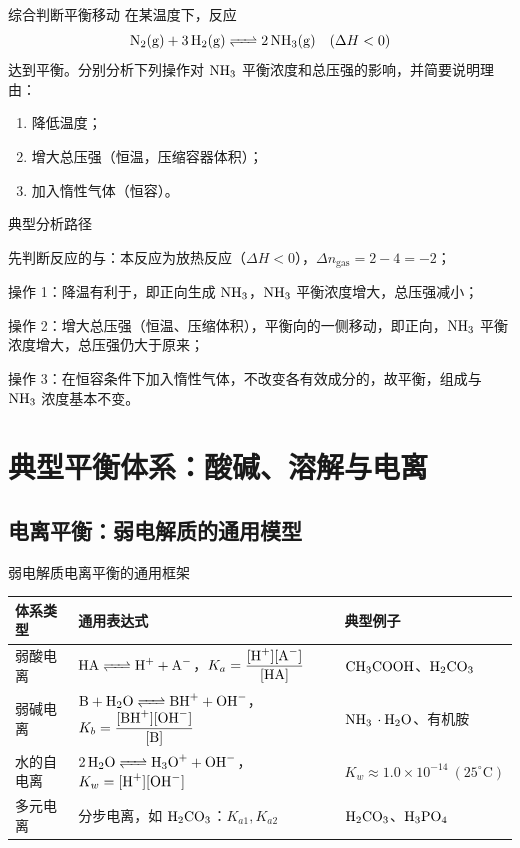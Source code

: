 \documentclass[a4paper,11pt]{ctexart}
\begin{document}
\begin{examplebox}{综合判断平衡移动}
  在某温度下，反应
  \[
    \ce{N2(g) + 3H2(g) <=> 2NH3(g)}\quad (\Delta H < 0)
  \]
  达到平衡。分别分析下列操作对 $\ce{NH3}$ 平衡浓度和总压强的影响，并简要说明理由：
  \begin{enumerate}
    \item 降低温度；
    \item 增大总压强（恒温，压缩容器体积）；
    \item 加入惰性气体（恒容）。
  \end{enumerate}

  \begin{proofbox}{典型分析路径}
    \begin{focuspoints}
      \item 先判断反应的与：本反应为放热反应（$\Delta H < 0$），$\Delta n_\mathrm{gas} = 2 - 4 = -2$；
      \item 操作 1：降温有利于，即正向生成 $\ce{NH3}$，$\ce{NH3}$ 平衡浓度增大，总压强减小；
      \item 操作 2：增大总压强（恒温、压缩体积），平衡向的一侧移动，即正向，$\ce{NH3}$ 平衡浓度增大，总压强仍大于原来；
      \item 操作 3：在恒容条件下加入惰性气体，不改变各有效成分的，故平衡，组成与 $\ce{NH3}$ 浓度基本不变。
    \end{focuspoints}
  \end{proofbox}
\end{examplebox}

\clearpage

\section{典型平衡体系：酸碱、溶解与电离}
\label{sec:specific-equilibria}

\subsection{电离平衡：弱电解质的通用模型}

\begin{summarybox}{弱电解质电离平衡的通用框架}
  \begin{tabularx}{0.96\textwidth}{>{\raggedright\arraybackslash}p{3.2cm} X X}
    \toprule
    体系类型 & 通用表达式 & 典型例子 \\
    \midrule
    弱酸电离 & $\ce{HA <=> H^+ + A^-}$，$K_a = \dfrac{[\ce{H^+}][\ce{A^-}]}{[\ce{HA}]}$ & $\ce{CH3COOH}$、$\ce{H2CO3}$ \\
    弱碱电离 & $\ce{B + H2O <=> BH^+ + OH^-}$，$K_b = \dfrac{[\ce{BH^+}][\ce{OH^-}]}{[\ce{B}]}$ & $\ce{NH3 \cdot H2O}$、有机胺 \\
    水的自电离 & $\ce{2H2O <=> H3O^+ + OH^-}$，$K_w = [\ce{H^+}][\ce{OH^-}]$ & $K_w \approx 1.0\times 10^{-14}\ (25^\circ\mathrm{C})$ \\
    多元电离 & 分步电离，如 $\ce{H2CO3}$：$K_{a1}, K_{a2}$ & $\ce{H2CO3}$、$\ce{H3PO4}$ \\
    \bottomrule
  \end{tabularx}
\end{summarybox}
\end{document}

